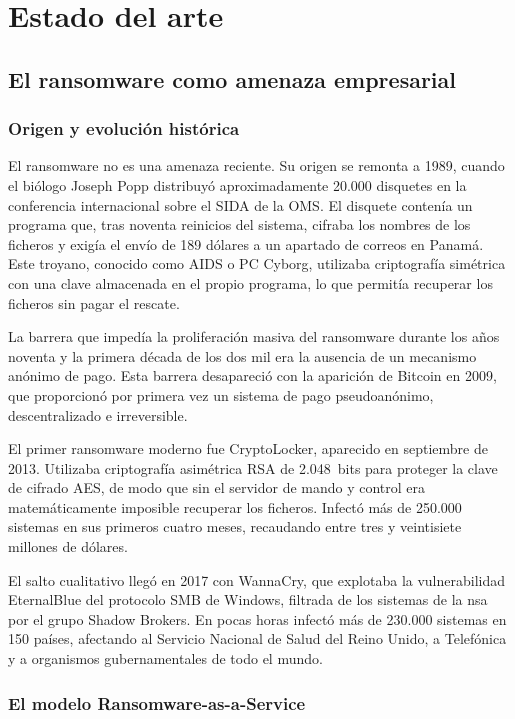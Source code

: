 \documentclass[../main.tex]{subfiles}
\begin{document}
\chapter{Estado del arte}
\label{C:estado_arte}

\section{El ransomware como amenaza empresarial}

\subsection{Origen y evolución histórica}

El ransomware no es una amenaza reciente. Su origen se remonta a 1989,
cuando el biólogo Joseph Popp distribuyó aproximadamente 20.000 disquetes
en la conferencia internacional sobre el SIDA de la OMS. El disquete
contenía un programa que, tras noventa reinicios del sistema, cifraba los
nombres de los ficheros y exigía el envío de 189 dólares a un apartado de
correos en Panamá. Este troyano, conocido como AIDS o PC Cyborg, utilizaba
criptografía simétrica con una clave almacenada en el propio programa, lo
que permitía recuperar los ficheros sin pagar el rescate.

La barrera que impedía la proliferación masiva del ransomware durante los
años noventa y la primera década de los dos mil era la ausencia de un
mecanismo anónimo de pago. Esta barrera desapareció con la aparición de
Bitcoin en 2009, que proporcionó por primera vez un sistema de pago
pseudoanónimo, descentralizado e irreversible.

El primer ransomware moderno fue CryptoLocker, aparecido en septiembre
de 2013. Utilizaba criptografía asimétrica RSA de 2.048~bits para proteger
la clave de cifrado AES, de modo que sin el servidor de mando y control era
matemáticamente imposible recuperar los ficheros. Infectó más de 250.000
sistemas en sus primeros cuatro meses, recaudando entre tres y veintisiete
millones de dólares.

El salto cualitativo llegó en 2017 con WannaCry, que explotaba la
vulnerabilidad EternalBlue del protocolo SMB de Windows, filtrada de los
sistemas de la \gls{nsa} por el grupo Shadow Brokers. En pocas horas
infectó más de 230.000 sistemas en 150 países, afectando al Servicio
Nacional de Salud del Reino Unido, a Telefónica y a organismos
gubernamentales de todo el mundo.

\subsection{El modelo Ransomware-as-a-Service}
\end{document}

